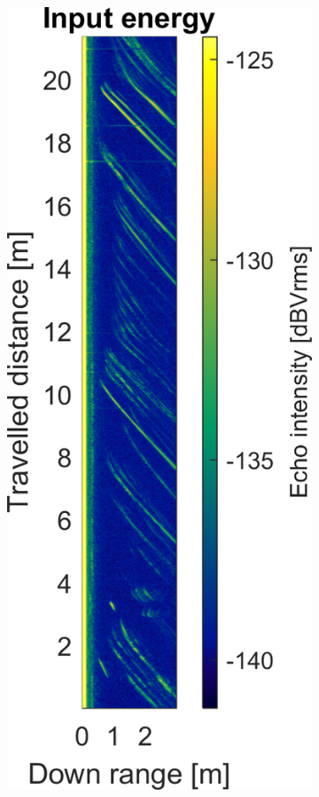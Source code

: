 \begin{figure}[htbp]
    \centering
    \begin{subfigure}[t]{0.475\linewidth}
        \centering
        \includegraphics[width=\linewidth,max height=.475\textheight]{gfx/results/orbit_input.png}

\end{subfigure}
\end{figure}
